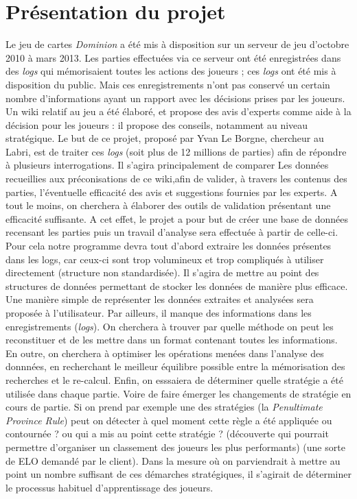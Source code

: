 \chapter{Présentation du projet}

Le jeu de cartes \textit{Dominion} a été mis à disposition sur un serveur de jeu d'octobre 2010 à mars 2013. Les parties effectuées via ce serveur ont été enregistrées dans des \textit{logs} qui mémorisaient toutes les actions des joueurs ; ces \textit{logs} ont été mis à disposition du public. Mais ces enregistrements n'ont pas conservé un certain nombre d'informations ayant un rapport avec les décisions prises par les joueurs.
\newline Un wiki relatif au jeu a été élaboré, et propose des avis d'experts comme aide à la décision pour les joueurs : il propose des conseils, notamment au niveau stratégique. Le but de ce projet, proposé par Yvan Le Borgne, chercheur au Labri, est de traiter ces \textit{logs} (soit plus de 12 millions de parties) afin de répondre à plusieurs interrogations. Il s'agira principalement de comparer Les données recueillies aux préconisations de ce wiki,afin de valider, à travers les contenus des parties, l'éventuelle efficacité des avis et suggestions fournies par les experts. A tout le moins, on cherchera à élaborer des outils de validation présentant une efficacité suffisante.
\newline A cet effet, le projet a pour but de créer une base de données recensant les parties puis un travail d'analyse sera effectuée à partir de celle-ci.
Pour cela notre programme devra tout d'abord extraire les données présentes dans les logs, car ceux-ci sont trop volumineux et trop compliqués à utiliser directement (structure non standardisée). Il s'agira de mettre au point des structures de données permettant de stocker les données de manière plus efficace. Une manière simple de représenter les données extraites et analysées sera proposée à l'utilisateur.
Par ailleurs, il manque des informations dans les enregistrements (\textit{logs}). On cherchera à trouver par quelle méthode on peut les reconstituer et de les mettre dans un format contenant toutes les informations.
En outre, on cherchera à optimiser les opérations menées dans l'analyse des donnnées, en recherchant le meilleur équilibre possible entre la mémorisation des recherches et le re-calcul.
Enfin, on esssaiera de déterminer quelle stratégie a été utilisée dans chaque partie. Voire de faire émerger les changements de stratégie en cours de partie. Si on prend par exemple une des stratégies (la \textit{Penultimate Province Rule}) peut on détecter à quel moment cette règle a été appliquée ou contournée ? ou qui a mis au point cette stratégie ? (découverte qui pourrait permettre d'organiser un classement des joueurs les plus performants) (une sorte de ELO demandé par le client). Dans la mesure où on parviendrait à mettre au point un nombre suffisant de ces démarches stratégiques, il s'agirait de déterminer le processus habituel d'apprentissage des joueurs.

